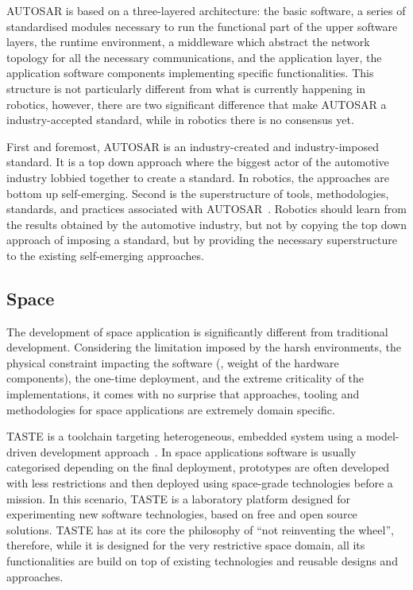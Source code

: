 AUTOSAR is based on a three-layered architecture: the basic software, a series of standardised modules necessary to run the functional part of the upper software layers, the runtime environment, a middleware which abstract the network topology for all the necessary communications, and the application layer, the application software components implementing specific functionalities. This structure is not particularly different from what is currently happening in robotics, however, there are two significant difference that make AUTOSAR a industry-accepted standard, while in robotics there is no consensus yet.

First and foremost, AUTOSAR is an industry-created and industry-imposed standard. It is a top down approach where the biggest actor of the automotive industry lobbied together to create a standard. In robotics, the approaches are bottom up self-emerging. Second is the superstructure of tools, methodologies, standards, and practices associated with AUTOSAR~\cite{arts2015testing, anssi2011enabling, giese2010model}. Robotics should learn from the results obtained by the automotive industry, but not by copying the top down approach of imposing a standard, but by providing the necessary superstructure to the existing self-emerging approaches.

\subsection{Space}
The development of space application is significantly different from traditional development. Considering the limitation imposed by the harsh environments, the physical constraint impacting the software (\eg, weight of the hardware components), the one-time deployment, and the extreme criticality of the implementations, it comes with no surprise that approaches, tooling and methodologies for space applications are extremely domain specific.

TASTE is a toolchain targeting heterogeneous, embedded system using a model-driven development approach~\cite{perrotin2010taste}. In space applications software is usually categorised depending on the final deployment, prototypes are often developed with less restrictions and then deployed using space-grade technologies before a mission. In this scenario, TASTE is a laboratory platform designed for experimenting new software technologies, based on free and open source solutions. TASTE has at its core the philosophy of ``not reinventing the wheel'', therefore, while it is designed for the very restrictive space domain, all its functionalities are build on top of existing technologies and reusable designs and approaches.

